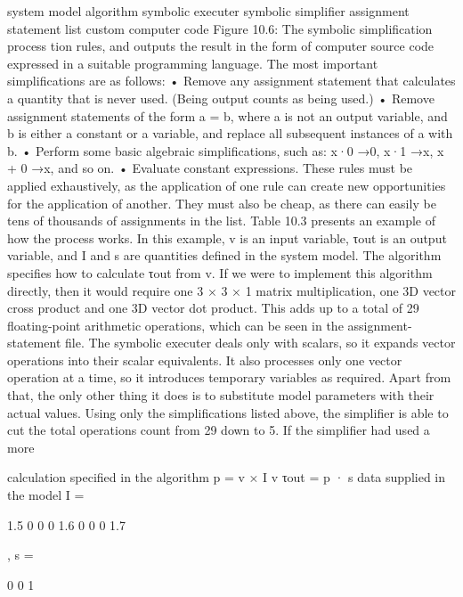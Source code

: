 system model algorithm symbolic executer symbolic simplifier assignment statement list custom computer code Figure 10.6: The symbolic simplification process tion rules, and outputs the result in the form of computer source code expressed in a suitable programming language. The most important simplifications are as follows: • Remove any assignment statement that calculates a quantity that is never used. (Being output counts as being used.) • Remove assignment statements of the form a = b, where a is not an output variable, and b is either a constant or a variable, and replace all subsequent instances of a with b. • Perform some basic algebraic simplifications, such as: x·0 →0, x·1 →x, x + 0 →x, and so on. • Evaluate constant expressions. These rules must be applied exhaustively, as the application of one rule can create new opportunities for the application of another. They must also be cheap, as there can easily be tens of thousands of assignments in the list. Table 10.3 presents an example of how the process works. In this example, v is an input variable, τout is an output variable, and I and s are quantities defined in the system model. The algorithm specifies how to calculate τout from v. If we were to implement this algorithm directly, then it would require one 3 × 3 × 1 matrix multiplication, one 3D vector cross product and one 3D vector dot product. This adds up to a total of 29 floating-point arithmetic operations, which can be seen in the assignment-statement file. The symbolic executer deals only with scalars, so it expands vector operations into their scalar equivalents. It also processes only one vector operation at a time, so it introduces temporary variables as required. Apart from that, the only other thing it does is to substitute model parameters with their actual values. Using only the simplifications listed above, the simplifier is able to cut the total operations count from 29 down to 5. If the simplifier had used a more

calculation specified in the algorithm p = v × I v τout = p · s data supplied in the model I =

1.5 0 0 0 1.6 0 0 0 1.7

, s =

0 0 1

